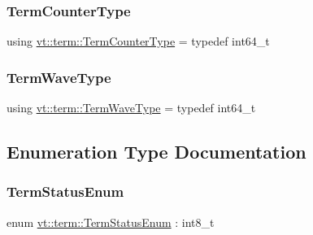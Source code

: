 \mbox{\label{namespacevt_1_1term_a4fd378cdb0c36683afc1b3399d685f7f}} 
\subsubsection{\texorpdfstring{Term\+Counter\+Type}{TermCounterType}}
{\footnotesize\ttfamily using \hyperlink{namespacevt_1_1term_a4fd378cdb0c36683afc1b3399d685f7f}{vt\+::term\+::\+Term\+Counter\+Type} = typedef int64\+\_\+t}

\mbox{\label{namespacevt_1_1term_a4af17606966b2b5a6cba523bc39095a3}} 
\subsubsection{\texorpdfstring{Term\+Wave\+Type}{TermWaveType}}
{\footnotesize\ttfamily using \hyperlink{namespacevt_1_1term_a4af17606966b2b5a6cba523bc39095a3}{vt\+::term\+::\+Term\+Wave\+Type} = typedef int64\+\_\+t}



\subsection{Enumeration Type Documentation}
\mbox{\label{namespacevt_1_1term_ad8ec9b371608fc88e7fdeef219785b27}} 
\subsubsection{\texorpdfstring{Term\+Status\+Enum}{TermStatusEnum}}
{\footnotesize\ttfamily enum \hyperlink{namespacevt_1_1term_ad8ec9b371608fc88e7fdeef219785b27}{vt\+::term\+::\+Term\+Status\+Enum} \+: int8\+\_\+t\hspace{0.3cm}{\ttfamily [strong]}}

